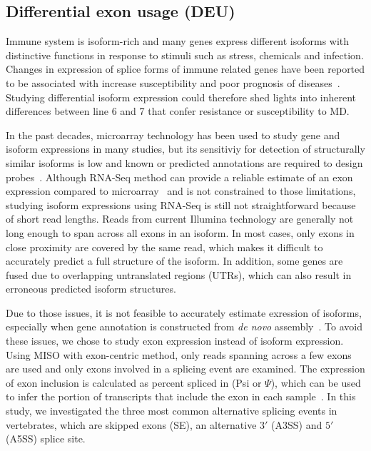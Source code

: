 \documentclass[10pt]{article}
\begin{document}
\subsection*{Differential exon usage (DEU)}

Immune system is isoform-rich and many genes express different isoforms with distinctive functions in response to
stimuli such as stress, chemicals and infection.
Changes in expression of splice forms of immune related genes have been reported to be associated with increase
susceptibility and poor prognosis of diseases~\cite{lynch2004consequences}.
Studying differential isoform expression could therefore shed lights into inherent differences between 
line 6 and 7 that confer resistance or susceptibility to MD.

In the past decades, microarray technology has been used to study gene and isoform expressions in many studies, but
its sensitiviy for detection of structurally similar isoforms is low and known or predicted annotations
are required to design probes~\cite{kane2000assessment}.
Although RNA-Seq method can provide a reliable estimate of an exon expression compared to microarray~\cite{pan2008deep}
and is not constrained to those limitations, studying isoform
expressions using RNA-Seq is still not straightforward because of short read lengths.
Reads from current Illumina technology are generally not long enough to span across all exons in an isoform.
In most cases, only exons in close proximity are covered by the same read, which makes it
difficult to accurately predict a full structure of the isoform.
In addition, some genes are fused due to overlapping untranslated regions (UTRs),
which can also result in erroneous predicted isoform structures.

Due to those issues, it is not feasible to accurately estimate exression of isoforms, especially when
gene annotation is constructed from \textit{de novo} assembly~\cite{trapnell2013differential}.
To avoid these issues, we chose to study exon expression instead of isoform expression.
Using MISO with exon-centric method, only reads spanning across a few exons are used and only exons
involved in a splicing event are examined.
The expression of exon inclusion is calculated as percent spliced in (Psi or $\Psi$), which can be used to
infer the portion of transcripts that include the exon in each sample~\cite{Katz:2010iv}.
In this study, we investigated the three most common alternative splicing events in vertebrates, which are skipped
exons (SE), an alternative $3\prime$ (A3SS) and $5\prime$ (A5SS) splice site.
\end{document}
